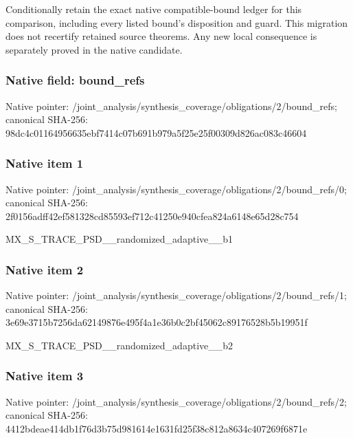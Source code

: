 \documentclass[10pt,a4paper]{article}
\begin{document}
\begingroup\raggedright\sloppy Conditionally retain the exact native compatible-bound ledger for this comparison,\allowbreak{} including every listed bound's disposition and guard. This migration does not recertify retained source theorems. Any new local consequence is separately proved in the native candidate.\par\endgroup

\subsubsection{Native field: bound\_\allowbreak{}refs}
Native pointer: /joint\_\allowbreak{}analysis/synthesis\_\allowbreak{}coverage/obligations/2/bound\_\allowbreak{}refs; canonical SHA-256: 98dc4c01164956635ebf7414c07b691b979a5f25e25f00309d826ac083c46604

\subsubsection{Native item 1}
Native pointer: /joint\_\allowbreak{}analysis/synthesis\_\allowbreak{}coverage/obligations/2/bound\_\allowbreak{}refs/0; canonical SHA-256: 2f0156adff42ef581328cd85593ef712c41250e940cfea824a6148e65d28c754

\begingroup\raggedright\sloppy MX\_\allowbreak{}S\_\allowbreak{}TRACE\_\allowbreak{}PSD\_\allowbreak{}\_\allowbreak{}randomized\_\allowbreak{}adaptive\_\allowbreak{}\_\allowbreak{}b1\par\endgroup

\subsubsection{Native item 2}
Native pointer: /joint\_\allowbreak{}analysis/synthesis\_\allowbreak{}coverage/obligations/2/bound\_\allowbreak{}refs/1; canonical SHA-256: 3e69e3715b7256da62149876e495f4a1e36b0c2bf45062c89176528b5b19951f

\begingroup\raggedright\sloppy MX\_\allowbreak{}S\_\allowbreak{}TRACE\_\allowbreak{}PSD\_\allowbreak{}\_\allowbreak{}randomized\_\allowbreak{}adaptive\_\allowbreak{}\_\allowbreak{}b2\par\endgroup

\subsubsection{Native item 3}
Native pointer: /joint\_\allowbreak{}analysis/synthesis\_\allowbreak{}coverage/obligations/2/bound\_\allowbreak{}refs/2; canonical SHA-256: 4412bdeae414db1f76d3b75d981614e1631fd25f38c812a8634c407269f6871e
\end{document}
